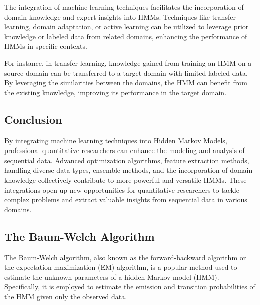 \documentclass[a4paper,11pt]{article}
\begin{document}
The integration of machine learning techniques facilitates the incorporation of domain knowledge and expert insights into HMMs. Techniques like transfer learning, domain adaptation, or active learning can be utilized to leverage prior knowledge or labeled data from related domains, enhancing the performance of HMMs in specific contexts.

For instance, in transfer learning, knowledge gained from training an HMM on a source domain can be transferred to a target domain with limited labeled data. By leveraging the similarities between the domains, the HMM can benefit from the existing knowledge, improving its performance in the target domain.

\subsection*{Conclusion}

By integrating machine learning techniques into Hidden Markov Models, professional quantitative researchers can enhance the modeling and analysis of sequential data. Advanced optimization algorithms, feature extraction methods, handling diverse data types, ensemble methods, and the incorporation of domain knowledge collectively contribute to more powerful and versatile HMMs. These integrations open up new opportunities for quantitative researchers to tackle complex problems and extract valuable insights from sequential data in various domains.

\subsection{The Baum-Welch Algorithm}
\label{sec:baum-welch}

The Baum-Welch algorithm, also known as the forward-backward algorithm or the expectation-maximization 
(EM) algorithm, is a popular method used to estimate the unknown parameters of a hidden Markov model (HMM). 
Specifically, it is employed to estimate the emission and transition probabilities of the HMM given only 
the observed data.
\end{document}
